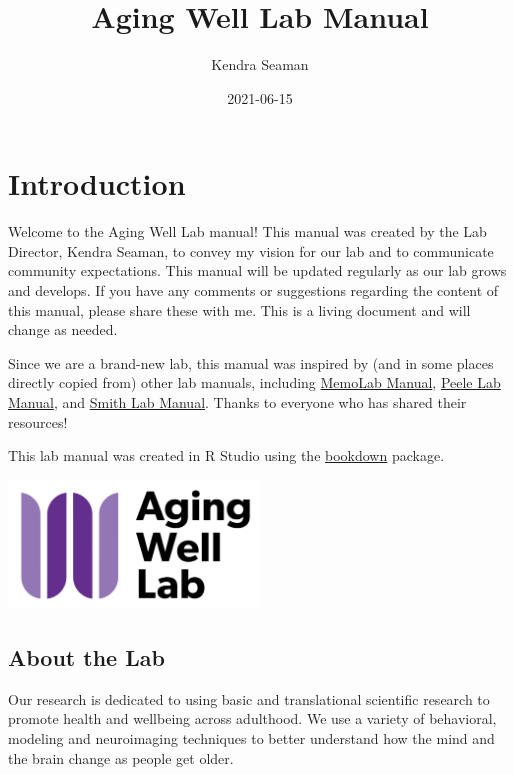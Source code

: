 \documentclass[]{book}
\title{Aging Well Lab Manual}
\author{Kendra Seaman}
\date{2021-06-15}
\begin{document}
\maketitle

{
\setcounter{tocdepth}{1}
\tableofcontents
}
\hypertarget{introduction}{%
\chapter{Introduction}\label{introduction}}

Welcome to the Aging Well Lab manual! This manual was created by the Lab Director, Kendra Seaman, to convey my vision for our lab and to communicate community expectations. This manual will be updated regularly as our lab grows and develops. If you have any comments or suggestions regarding the content of this manual, please share these with me. This is a living document and will change as needed.

Since we are a brand-new lab, this manual was inspired by (and in some places directly copied from) other lab manuals, including \href{https://github.com/memobc/memolab-manual}{MemoLab Manual}, \href{http://jpeelle.net/peellelab_manual.pdf}{Peele Lab Manual}, and \href{https://github.com/DVSneuro/smithlab_manual/blob/master/SmithLab_manual.pdf}{Smith Lab Manual}. Thanks to everyone who has shared their resources!

This lab manual was created in R Studio using the \href{https://bookdown.org/yihui/bookdown/}{bookdown} package.

\includegraphics[width=0.5\textwidth,height=\textheight]{images/awl.png}

\hypertarget{about-the-lab}{%
\section{About the Lab}\label{about-the-lab}}

Our research is dedicated to using basic and translational scientific research to promote health and wellbeing across adulthood. We use a variety of behavioral, modeling and neuroimaging techniques to better understand how the mind and the brain change as people get older.
\end{document}
